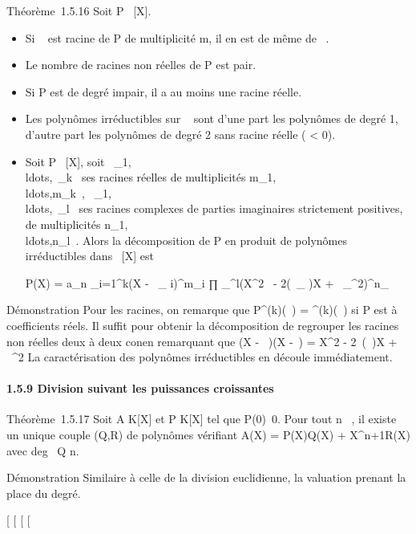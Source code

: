 \documentclass[]{article}
\begin{document}
Théorème~1.5.16 Soit P \in {}~{[}X{]}.

\begin{itemize}
\item
  Si \alpha~ \in {} est racine de P de multiplicité m, il en est de même de
  \overline\alpha~.
\item
  Le nombre de racines non réelles de P est pair.
\item
  Si P est de degré impair, il a au moins une racine réelle.
\item
  Les polynômes irréductibles sur ~ sont d'une part les polynômes de
  degré 1, d'autre part les polynômes de degré 2 sans racine réelle (\Delta
  \textless{} 0).
\item
  Soit P \in {}~{[}X{]}, soit
  \alpha~\_1,\\ldots,\alpha~\_k~
  ses racines réelles de multiplicités
  m\_1,\\ldots,m\_k~,
  \beta~\_1,\\ldots,\beta~\_l~
  ses racines complexes de parties imaginaires strictement positives, de
  multiplicités
  n\_1,\\ldots,n\_l~.
  Alors la décomposition de P en produit de polynômes irréductibles dans
  ~{[}X{]} est

  P(X) = a\_n \∏
  \_i=1^k(X - \alpha~\_ i)^m\_i 
  ∏ \_^l(X^2~ -
  2\mathrmRe(\beta~\_ \jmath)X +
  \textbar{}\beta~\_\jmath\textbar{}^2)^n\_\jmath 
\end{itemize}

Démonstration Pour les racines, on remarque que
P^(k)(\overline\alpha~) =
\overlineP^(k)(\alpha~) si P est à coefficients
réels. Il suffit pour obtenir la décomposition de regrouper les racines
non réelles deux à deux con en remarquant que (X - \beta~)(X
-\overline\beta~) = X^2 -
2\mathrmRe~(\beta~)X +
\textbar{}\beta~\textbar{}^2 La caractérisation des polynômes
irréductibles en découle immédiatement.

\paragraph{1.5.9 Division suivant les puissances croissantes}

Théorème~1.5.17 Soit A \in K{[}X{]} et P \in K{[}X{]} tel que
P(0)\neq~0. Pour tout n \in {}~, il existe un unique
couple (Q,R) de polynômes vérifiant A(X) = P(X)Q(X) +
X^n+1R(X) avec deg~ Q \leq n.

Démonstration Similaire à celle de la division euclidienne, la valuation
prenant la place du degré.

{[}
{[}
{[}
{[}
\end{document}
